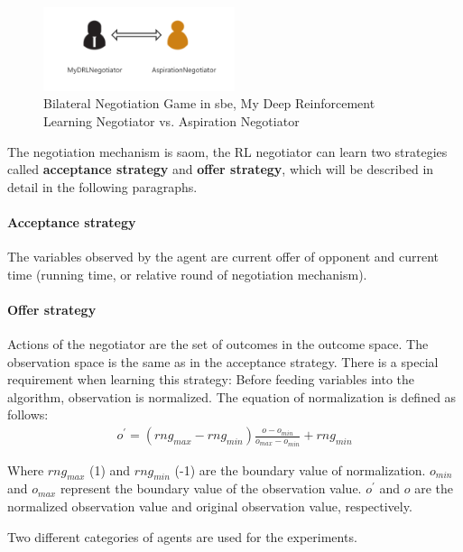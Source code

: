 \begin{figure}[htbp]
\centering
\includegraphics[width=0.50\textwidth]{./images/bilateral-negotiation.png}
\caption{Bilateral Negotiation Game in \gls{sbe}, My Deep Reinforcement Learning Negotiator vs. Aspiration Negotiator}
\label{fig:bilateral-negotiation}
\end{figure}

The negotiation mechanism is \gls{saom}, the RL negotiator can learn two strategies called \textbf{acceptance strategy} and \textbf{offer strategy}, which will be described in detail in the following paragraphs. 

\paragraph{Acceptance strategy} The variables observed by the agent are current offer of opponent and current time (running time, or relative round of negotiation mechanism).

\paragraph{Offer strategy} Actions of the negotiator are the set of outcomes in the outcome space. The observation space is the same as in the acceptance strategy. There is a special requirement when learning this strategy: Before feeding variables into the algorithm, observation is normalized. The equation of normalization is defined as follows:
\begin{equation}
\begin{aligned}
o^{\prime} = (rng_{max} - rng_{min}) \frac{o - o_{min}}{o_{max} - o_{min}} + rng_{min}
\end{aligned}
\end{equation}

Where $rng_{max}$ (1) and $rng_{min}$ (-1) are the boundary value of normalization. $o_{min}$ and $o_{max}$ represent the boundary value of the observation value. $o^{\prime}$ and $o$ are the normalized observation value and original observation value, respectively. 

Two different categories of agents are used for the experiments.

